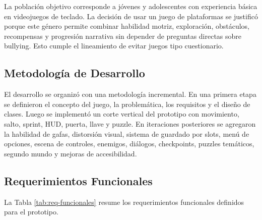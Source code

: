 \documentclass[conference]{IEEEtran}
\begin{document}
La población objetivo corresponde a jóvenes y adolescentes con experiencia básica en videojuegos de teclado. La decisión de usar un juego de plataformas se justificó porque este género permite combinar habilidad motriz, exploración, obstáculos, recompensas y progresión narrativa sin depender de preguntas directas sobre bullying. Esto cumple el lineamiento de evitar juegos tipo cuestionario.

\subsection{Metodología de Desarrollo}
El desarrollo se organizó con una metodología incremental. En una primera etapa se definieron el concepto del juego, la problemática, los requisitos y el diseño de clases. Luego se implementó un corte vertical del prototipo con movimiento, salto, sprint, HUD, puerta, llave y puzzle. En iteraciones posteriores se agregaron la habilidad de gafas, distorsión visual, sistema de guardado por slots, menú de opciones, escena de controles, enemigos, diálogos, checkpoints, puzzles temáticos, segundo mundo y mejoras de accesibilidad.

\subsection{Requerimientos Funcionales}
La Tabla \ref{tab:req-funcionales} resume los requerimientos funcionales definidos para el prototipo.
\end{document}
